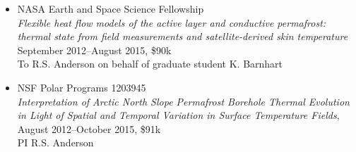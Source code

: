 \documentclass[10pt]{article}
\renewcommand{\section}[1]{\pagebreak[3]%
    \vspace{1.3\baselineskip}%
    \phantomsection\addcontentsline{toc}{section}{#1}%
    \noindent\llap{\large\scshape\smash{\parbox[t]{\marginparwidth}{\hyphenpenalty=10000\raggedright #1}}}%
    \vspace{-\baselineskip}\par}
\begin{document}
\begin{itemize}
	\item NASA Earth and Space Science Fellowship\\ 
	\textit{Flexible heat flow models of the active layer and conductive permafrost: thermal state from field measurements and satellite-derived skin temperature} 
	\\September 2012--August 2015, \$90k
	\\To R.S. Anderson on behalf of graduate student K. Barnhart
	
	\item NSF Polar Programs 1203945\\ 
	\textit{Interpretation of Arctic North Slope Permafrost Borehole Thermal Evolution in Light of Spatial and Temporal Variation in Surface Temperature Fields}, 
	\\August 2012--October 2015, \$91k 
	\\PI R.S. Anderson
	
\end{itemize}


\end{document}
